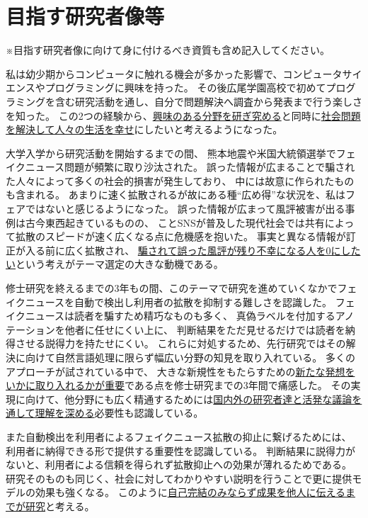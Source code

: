 
\section{目指す研究者像等}
\begin{spacing}{1.08}
\noindent
{} {\footnotesize ※目指す研究者像に向けて身に付けるべき資質も含め記入してください。}

私は幼少期からコンピュータに触れる機会が多かった影響で、コンピュータサイエンスやプログラミングに興味を持った。
その後広尾学園高校で初めてプログラミングを含む研究活動を通し、自分で問題解決へ調査から発表まで行う楽しさを知った。
この2つの経験から、\underline{興味のある分野を研ぎ究める}と同時に\underline{社会問題を解決して人々の生活を幸せ}にしたいと考えるようになった。

大学入学から研究活動を開始するまでの間、
熊本地震や米国大統領選挙でフェイクニュース問題が頻繁に取り沙汰された。
誤った情報が広まることで騙された人々によって多くの社会的損害が発生しており、
中には故意に作られたものも含まれる。
あまりに速く拡散されるが故にある種``広め得''な状況を、私はフェアではないと感じるようになった。
誤った情報が広まって風評被害が出る事例は古今東西起きているものの、
ことSNSが普及した現代社会では共有によって拡散のスピードが速く広くなる点に危機感を抱いた。
事実と異なる情報が訂正が入る前に広く拡散され、
\underline{騙されて誤った風評が残り不幸になる人を0にしたい}という考えがテーマ選定の大きな動機である。

修士研究を終えるまでの3年もの間、このテーマで研究を進めていくなかでフェイクニュースを自動で検出し利用者の拡散を抑制する難しさを認識した。
フェイクニュースは読者を騙すため精巧なものも多く、
真偽ラベルを付加するアノテーションを他者に任せにくい上に、
判断結果をただ見せるだけでは読者を納得させる説得力を持たせにくい。
これらに対処するため、先行研究ではその解決に向けて自然言語処理に限らず幅広い分野の知見を取り入れている。
多くのアプローチが試されている中で、
大きな新規性をもたらすための\underline{新たな発想をいかに取り入れるかが重要}である点を修士研究までの3年間で痛感した。
その実現に向けて、他分野にも広く精通するためには\underline{国内外の研究者達と活発な議論を通して理解を深める}必要性も認識している。

また自動検出を利用者によるフェイクニュース拡散の抑止に繋げるためには、
利用者に納得できる形で提供する重要性を認識している。
判断結果に説得力がないと、利用者による信頼を得られず拡散抑止への効果が薄れるためである。
研究そのものも同じく、社会に対してわかりやすい説明を行うことで更に提供モデルの効果も強くなる。
このように\underline{自己完結のみならず成果を他人に伝えるまでが研究}と考える。


\end{spacing}
